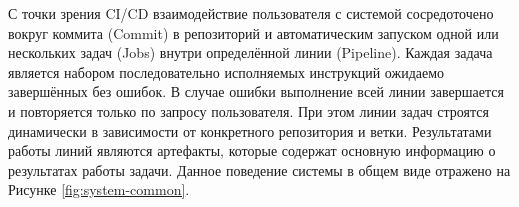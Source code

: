 С точки зрения CI/CD взаимодействие пользователя с системой сосредоточено вокруг коммита (Commit) в репозиторий и
автоматическим запуском одной или нескольких задач (Jobs) внутри определённой линии (Pipeline).
Каждая задача является набором последовательно исполняемых инструкций ожидаемо завершённых без ошибок.
В случае ошибки выполнение всей линии завершается и повторяется только по запросу пользователя.
При этом линии задач строятся динамически в зависимости от конкретного репозитория и ветки.
Результатами работы линий являются артефакты, которые содержат основную информацию о результатах работы задачи.
Данное поведение системы в общем виде отражено на Рисунке \ref{fig:system-common}.

\begin{figure}[h!]
    \centering
\end{figure}
